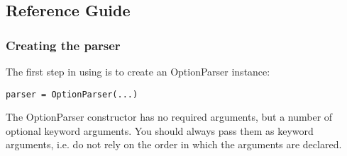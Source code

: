 \subsection{Reference Guide\label{optparse-reference-guide}}


\subsubsection{Creating the parser\label{optparse-creating-parser}}

The first step in using  is to create an OptionParser instance:
\begin{verbatim}
parser = OptionParser(...)
\end{verbatim}

The OptionParser constructor has no required arguments, but a number of
optional keyword arguments.  You should always pass them as keyword
arguments, i.e. do not rely on the order in which the arguments are
declared.
